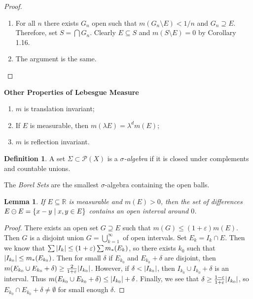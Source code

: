 \documentclass[leqno, openany]{memoir}
\newtheorem{lem}[thm]{Lemma}
\theoremstyle{definition}
\newtheorem{defn}[thm]{Definition}
\theoremstyle{remark}
\theoremstyle{plain}
\theoremstyle{definition}
\theoremstyle{remark}
\newcommand{\R}{\mathbb{R}}
\newcommand{\ep}{\varepsilon}
\newcommand{\mc}[1]{\mathcal{#1}}
\begin{document}
\begin{proof}
    \begin{enumerate}
        \item For all $n$ there exists $G_n$ open such that $m(G_n \setminus E) < 1/n$ and $G_n \supseteq E$. Therefore, set $S = \bigcap G_n$. Clearly $E \subseteq S$ and $m(S \setminus E) = 0$ by Corollary 1.16.
        \item The argument is the same.
    \end{enumerate}
\end{proof}

\textbf{Other Properties of Lebesgue Measure}
\begin{enumerate}
    \item $m$ is translation invariant;
    \item If $E$ is measurable, then $m(\lambda E) = \lambda^d m(E)$;
    \item $m$ is reflection invariant.
\end{enumerate}

\begin{defn}
    A set $\Sigma \subset \mc{P}(X)$ is a \textit{$\sigma$-algebra} if it is closed under complements and countable unions.
\end{defn}

The \textit{Borel Sets} are the smallest $\sigma$-algebra containing the open balls.

\begin{lem}
    If $E \subseteq \R$ is measurable and $m(E) > 0$, then the set of differences $E \ominus E = \qty{x - y \mid x,y \in E}$ contains an open interval around $0$.
\end{lem}

\begin{proof}
    There exists an open set $G \supseteq E$ such that $m(G) \leq (1+\ep) m(E)$. Then $G$ is a disjoint union $G = \bigcup_{k=1}^{\infty}$ of open intervals. Set $E_k = I_k \cap E$. Then we know that $\sum \abs{I_k} \leq (1+\ep) \sum m_*(E_k)$, so there exists $k_0$ such that $\abs{I_{k_0}} \leq m_*(E_{k_0})$. Then for small $\delta$ if $E_{k_0}$ and $E_{k_0} + \delta$ are disjoint, then $m(E_{k_0} \cup E_{k_0} + \delta) \geq \frac{2}{1+\ep} \abs{I_{k_0}}$. However, if $\delta < \abs{I_{k_0}}$, then $I_{k_0} \cup I_{k_0} + \delta$ is an interval. Thus $m(E_{k_0} \cup E_{k_0} + \delta) \leq \abs{I_{k_0}} + \delta$. Finally, we see that $\delta \geq \frac{1-\ep}{1+\ep} \abs{I_{k_0}}$, so $E_{k_0} \cap E_{k_0} + \delta \neq \emptyset$ for small enough $\delta$.
\end{proof}
\end{document}
